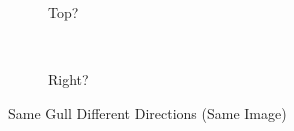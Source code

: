 \documentclass[10pt, a4paper]{article}
\begin{document}
\begin{figure}[htbp]
\begin{subfigure}[b]{0.3\textwidth}
		\caption{Top?}
		\label{fig:gullTop}
	\end{subfigure}
	~
	\begin{subfigure}[b]{0.3\textwidth}
		\caption{Right?}
		\label{fig:gullRight}
	\end{subfigure}
	\caption{Same Gull Different Directions (Same Image)}
	\label{fig:gullAndDirections}
\end{figure}
\end{document}
